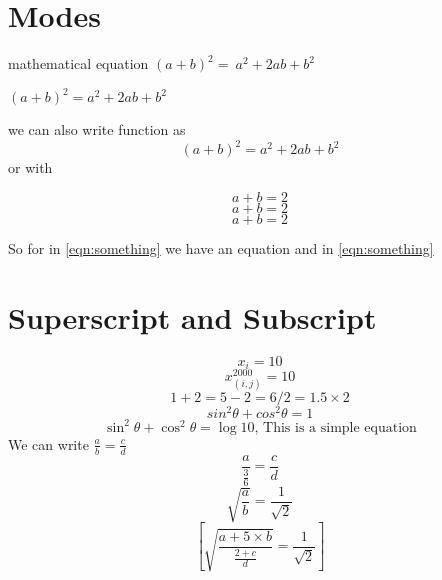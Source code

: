 \documentclass[a4paper, 12pt]{article}
\begin{document}
	\section{Modes}
	mathematical equation
	$ (a+b)^2 = \ a^2+2ab+b^2$
	
	\begin{math}
		(a+b)^2 = a^2 + 2ab + b^2
	\end{math}
	
	we can also write function as 
	\begin{displaymath}
		(a+b)^2 = a^2 + 2ab + b^2
	\end{displaymath}
	or with
	
	\begin{equation}
		a + b = 2
	\end{equation}
	\begin{equation}
		a + b = 2
	\end{equation}
	\begin{equation} \label{eqn:something}
		a + b = 2
	\end{equation}
	
	So for in \autoref{eqn:something} we have an equation and in \ref{eqn:something}
	
	\section{Superscript and Subscript}
	\begin{equation}
		x_i = 10	
	\end{equation}
	\begin{equation}
		x^{2000}_{(i,j)} = 10
	\end{equation}
	\begin{equation}
		1 + 2 = 5 -2 = 6/2 = 1.5 \times 2
	\end{equation}
	\begin{equation}
		sin^2\theta + cos^2\theta = 1
	\end{equation}
	\begin{equation*}
		\sin^2\theta + \cos^2\theta = \log10
		\text{, This is a simple equation}
	\end{equation*}
	We can write $\frac{a}{b} = \frac{c}{d}$
	\begin{equation}
		\frac{a}{\frac{3}{6}} = \frac{c}{d}
	\end{equation}
	\begin{equation}
		\sqrt{\frac{a}{b}} = \frac{1}{\sqrt{2}}
	\end{equation}
	\begin{equation}
		\left[
		\sqrt{\frac{a + 5 \times b}{\frac{2+c}{d}}} = \frac{1}{\sqrt{2}}
		\right]
	\end{equation}
	
\end{document}
